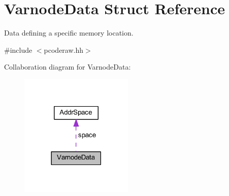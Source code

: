 \hypertarget{struct_varnode_data}{}\section{Varnode\+Data Struct Reference}
\label{struct_varnode_data}


Data defining a specific memory location.  




{\ttfamily \#include $<$pcoderaw.\+hh$>$}



Collaboration diagram for Varnode\+Data\+:
\nopagebreak
\begin{figure}[H]
\begin{center}
\leavevmode
\includegraphics[width=153pt]{struct_varnode_data__coll__graph}
\end{center}
\end{figure}
